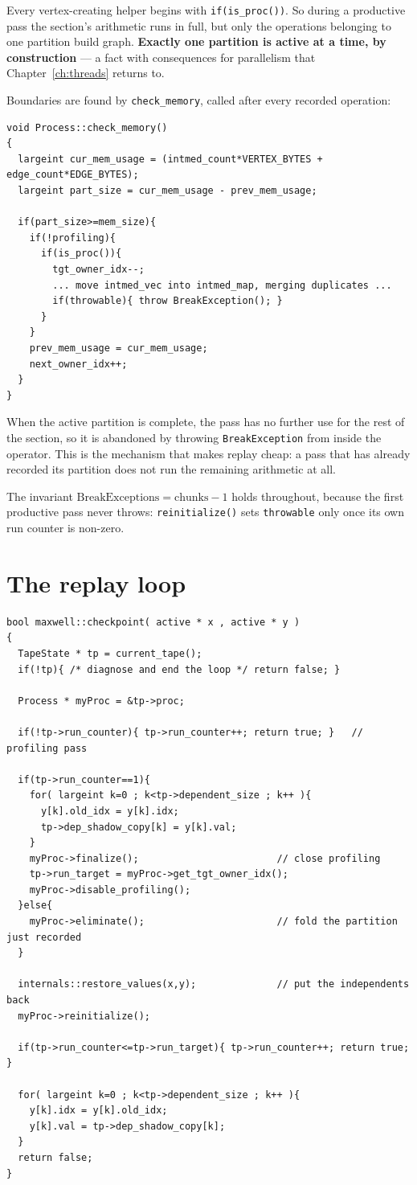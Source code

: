 \documentclass[11pt,a4paper]{report}
\newcommand{\code}[1]{\texttt{#1}}
\begin{document}
\noindent
Every vertex-creating helper begins with \code{if(is\_proc())}. So during a
productive pass the section's arithmetic runs in full, but only the operations
belonging to one partition build graph. \textbf{Exactly one partition is active
at a time, by construction} --- a fact with consequences for parallelism that
Chapter~\ref{ch:threads} returns to.

Boundaries are found by \code{check\_memory}, called after every recorded
operation:

\begin{lstlisting}
void Process::check_memory()
{
  largeint cur_mem_usage = (intmed_count*VERTEX_BYTES + edge_count*EDGE_BYTES);
  largeint part_size = cur_mem_usage - prev_mem_usage;

  if(part_size>=mem_size){
    if(!profiling){
      if(is_proc()){
        tgt_owner_idx--;
        ... move intmed_vec into intmed_map, merging duplicates ...
        if(throwable){ throw BreakException(); }
      }
    }
    prev_mem_usage = cur_mem_usage;
    next_owner_idx++;
  }
}
\end{lstlisting}

When the active partition is complete, the pass has no further use for the rest
of the section, so it is abandoned by throwing \code{BreakException} from inside
the operator. This is the mechanism that makes replay cheap: a pass that has
already recorded its partition does not run the remaining arithmetic at all.

The invariant $\text{BreakExceptions} = \text{chunks} - 1$ holds throughout,
because the first productive pass never throws: \code{reinitialize()} sets
\code{throwable} only once its own run counter is non-zero.

\section{The replay loop}

\begin{lstlisting}
bool maxwell::checkpoint( active * x , active * y )
{
  TapeState * tp = current_tape();
  if(!tp){ /* diagnose and end the loop */ return false; }

  Process * myProc = &tp->proc;

  if(!tp->run_counter){ tp->run_counter++; return true; }   // profiling pass

  if(tp->run_counter==1){
    for( largeint k=0 ; k<tp->dependent_size ; k++ ){
      y[k].old_idx = y[k].idx;
      tp->dep_shadow_copy[k] = y[k].val;
    }
    myProc->finalize();                        // close profiling
    tp->run_target = myProc->get_tgt_owner_idx();
    myProc->disable_profiling();
  }else{
    myProc->eliminate();                       // fold the partition just recorded
  }

  internals::restore_values(x,y);              // put the independents back
  myProc->reinitialize();

  if(tp->run_counter<=tp->run_target){ tp->run_counter++; return true; }

  for( largeint k=0 ; k<tp->dependent_size ; k++ ){
    y[k].idx = y[k].old_idx;
    y[k].val = tp->dep_shadow_copy[k];
  }
  return false;
}
\end{lstlisting}
\end{document}
